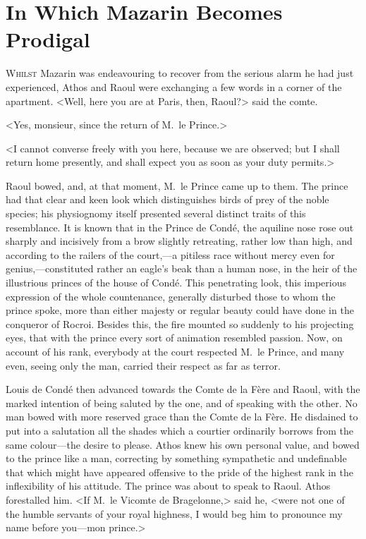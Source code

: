 \chapter{In Which Mazarin Becomes Prodigal}

\lettrine{W}{hilst} Mazarin was endeavouring to recover from the serious alarm he had just experienced, Athos and Raoul were exchanging a few words in a corner of the apartment. <Well, here you are at Paris, then, Raoul?> said the comte.

\zz
<Yes, monsieur, since the return of M.~le Prince.>

<I cannot converse freely with you here, because we are observed; but I shall return home presently, and shall expect you as soon as your duty permits.>

Raoul bowed, and, at that moment, M.~le Prince came up to them. The prince had that clear and keen look which distinguishes birds of prey of the noble species; his physiognomy itself presented several distinct traits of this resemblance. It is known that in the Prince de Condé, the aquiline nose rose out sharply and incisively from a brow slightly retreating, rather low than high, and according to the railers of the court,—a pitiless race without mercy even for genius,—constituted rather an eagle's beak than a human nose, in the heir of the illustrious princes of the house of Condé. This penetrating look, this imperious expression of the whole countenance, generally disturbed those to whom the prince spoke, more than either majesty or regular beauty could have done in the conqueror of Rocroi. Besides this, the fire mounted so suddenly to his projecting eyes, that with the prince every sort of animation resembled passion. Now, on account of his rank, everybody at the court respected M.~le Prince, and many even, seeing only the man, carried their respect as far as terror.

Louis de Condé then advanced towards the Comte de la Fère and Raoul, with the marked intention of being saluted by the one, and of speaking with the other. No man bowed with more reserved grace than the Comte de la Fère. He disdained to put into a salutation all the shades which a courtier ordinarily borrows from the same colour—the desire to please. Athos knew his own personal value, and bowed to the prince like a man, correcting by something sympathetic and undefinable that which might have appeared offensive to the pride of the highest rank in the inflexibility of his attitude. The prince was about to speak to Raoul. Athos forestalled him. <If M.~le Vicomte de Bragelonne,> said he, <were not one of the humble servants of your royal highness, I would beg him to pronounce my name before you—mon prince.>


